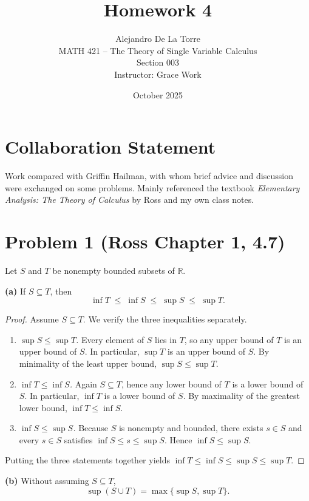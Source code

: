\documentclass[12pt]{article}
\title{Homework 4}
\author{Alejandro De La Torre \\ MATH 421 -- The Theory of Single Variable Calculus \\ Section 003 \\ Instructor: Grace Work}
\date{October 2025}
\begin{document}
\maketitle

\section*{Collaboration Statement}
Work compared with Griffin Hailman, with whom brief advice and discussion were exchanged on some problems. Mainly referenced the textbook \textit{Elementary Analysis: The Theory of Calculus} by Ross and my own class notes. 

\section*{Problem 1 (Ross Chapter 1, 4.7)}
Let $S$ and $T$ be nonempty bounded subsets of $\mathbb{R}$.

\medskip
\noindent\textbf{(a)} If $S\subseteq T$, then
\[
\inf T \;\le\; \inf S \;\le\; \sup S \;\le\; \sup T .
\]

\begin{proof}
Assume $S\subseteq T$. We verify the three inequalities separately.
\begin{enumerate}[label=\roman*)]
  \item \emph{$\sup S\le \sup T$.}  Every element of $S$ lies in $T$, so any
  upper bound of $T$ is an upper bound of $S$. In particular,
  $\sup T$ is an upper bound of $S$. By minimality of the least upper bound,
  $\sup S\le \sup T$.

  \item \emph{$\inf T\le \inf S$.}  Again $S\subseteq T$, hence any lower bound
  of $T$ is a lower bound of $S$. In particular, $\inf T$ is a lower
  bound of $S$. By maximality of the greatest lower bound, $\inf T\le \inf S$.

  \item \emph{$\inf S\le \sup S$.}  Because $S$ is nonempty and bounded,
  there exists $s\in S$ and every $s\in S$ satisfies
  $\inf S\le s\le \sup S$. Hence $\inf S\le \sup S$.
\end{enumerate}
Putting the three statements together yields
$\inf T \le \inf S \le \sup S \le \sup T$.
\end{proof}

\medskip
\noindent\textbf{(b)} Without assuming $S\subseteq T$,
\[
\sup(S\cup T)=\max\{\sup S,\sup T\}.
\]
\end{document}
